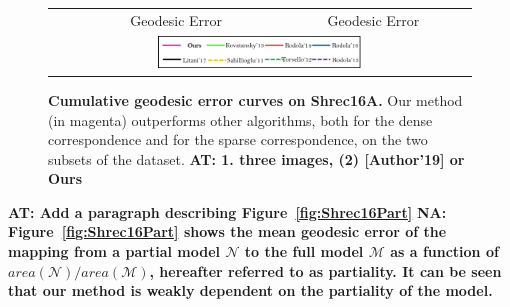 \documentclass[10pt,twocolumn,letterpaper]{article}
\newcommand{\colornote}[3]{{\color{#1}\bf{#2: #3}\normalfont}}
\newcommand{\colornote}[3]{}
\newcommand {\ayellet}[1]{\colornote{blue}{AT}{#1}}
\newcommand {\nadav}[1]{\colornote{red}{NA}{#1}}
\begin{document}
\begin{figure}[htb]
\begin{tabular}{ccc}
		& Geodesic Error & Geodesic Error\\
		\multicolumn{3}{c}{\includegraphics[width=0.5\textwidth]{figures/SHREC16Amethods.png}}
	\end{tabular}
	\caption{{\bf Cumulative geodesic error curves on Shrec16A.} 
	Our method (in magenta) outperforms other algorithms, both for the dense correspondence and for the sparse correspondence, on the two subsets of the dataset.
	\ayellet{1. three images, (2) [Author'19] or Ours}}
	\label{fig:Shrec16Cumulative}
\end{figure}

\ayellet{Add a paragraph describing Figure~\ref{fig:Shrec16Part}}
\nadav{Figure~\ref{fig:Shrec16Part} shows the mean geodesic error of the mapping from a partial model $\mathcal{N}$ to the full model $\mathcal{M}$ as a function of $area(\mathcal{N})/area(\mathcal{M})$, hereafter referred to as partiality. It can be seen that our method is weakly dependent on the partiality of the model.}
\end{document}
